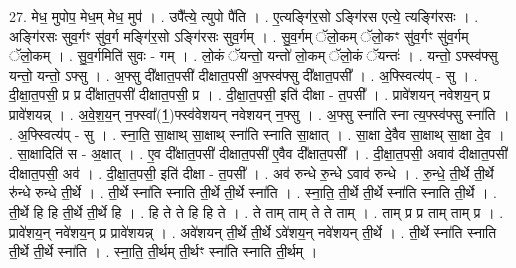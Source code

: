 \documentclass[17pt]{extarticle}
\begin{document}
27. मेध॒ मुपोप॒ मेध॒म् मेध॒ मुप॑ । . उपै᳚त्ये॒ त्युपो पै॑ति । . ए॒त्यङ्गि॑र॒सो ऽङ्गि॑रस एत्ये॒ त्यङ्गि॑रसः । . अङ्गि॑रसः सुव॒र्गꣳ सु॑व॒र्ग मङ्गि॑र॒सो ऽङ्गि॑रसः सुव॒र्गम् । . सु॒व॒र्गम् ॅलो॒कम् ॅलो॒कꣳ सु॑व॒र्गꣳ सु॑व॒र्गम् ॅलो॒कम् । . सु॒व॒र्गमिति॑ सुवः - गम् । . लो॒कं ॅयन्तो॒ यन्तो॑ लो॒कम् ॅलो॒कं ॅयन्तः॑ । . यन्तो॒ ऽफ्स्व॑फ्सु यन्तो॒ यन्तो॒ ऽफ्सु । . अ॒फ्सु दी᳚क्षात॒पसी॑ दीक्षात॒पसी॑ अ॒फ्स्व॑फ्सु दी᳚क्षात॒पसी᳚ । . अ॒फ्स्वित्य॑प् - सु । . दी॒क्षा॒त॒पसी॒ प्र प्र दी᳚क्षात॒पसी॑ दीक्षात॒पसी॒ प्र । . दी॒क्षा॒त॒पसी॒ इति॑ दीक्षा - त॒पसी᳚ । . प्रावे॑शयन् नवेशय॒न् प्र प्रावे॑शयन्न् । . अ॒वे॒श॒य॒न् न॒फ्स्वा᳚(1॒)फ्स्व॑वेशयन् नवेशयन् न॒फ्सु । . अ॒फ्सु स्ना॑ति स्ना त्य॒फ्स्व॑फ्सु स्ना॑ति । . अ॒फ्स्वित्य॑प् - सु । . स्ना॒ति॒ सा॒क्षाथ् सा॒क्षाथ् स्ना॑ति स्नाति सा॒क्षात् । . सा॒क्षा दे॒वैव सा॒क्षाथ् सा॒क्षा दे॒व । . सा॒क्षादिति॑ स - अ॒क्षात् । . ए॒व दी᳚क्षात॒पसी॑ दीक्षात॒पसी॑ ए॒वैव दी᳚क्षात॒पसी᳚ । . दी॒क्षा॒त॒पसी॒ अवाव॑ दीक्षात॒पसी॑ दीक्षात॒पसी॒ अव॑ । . दी॒क्षा॒त॒पसी॒ इति॑ दीक्षा - त॒पसी᳚ । . अव॑ रुन्धे रु॒न्धे ऽवाव॑ रुन्धे । . रु॒न्धे॒ ती॒र्थे ती॒र्थे रु॑न्धे रुन्धे ती॒र्थे । . ती॒र्थे स्ना॑ति स्नाति ती॒र्थे ती॒र्थे स्ना॑ति । . स्ना॒ति॒ ती॒र्थे ती॒र्थे स्ना॑ति स्नाति ती॒र्थे । . ती॒र्थे हि हि ती॒र्थे ती॒र्थे हि । . हि ते ते हि हि ते । . ते ताम् ताम् ते ते ताम् । . ताम् प्र प्र ताम् ताम् प्र । . प्रावे॑शय॒न् नवे॑शय॒न् प्र प्रावे॑शयन्न् । . अवे॑शयन् ती॒र्थे ती॒र्थे ऽवे॑शय॒न् नवे॑शयन् ती॒र्थे । . ती॒र्थे स्ना॑ति स्नाति ती॒र्थे ती॒र्थे स्ना॑ति । . स्ना॒ति॒ ती॒र्थम् ती॒र्थꣳ स्ना॑ति स्नाति ती॒र्थम् । \newline
\end{document}
